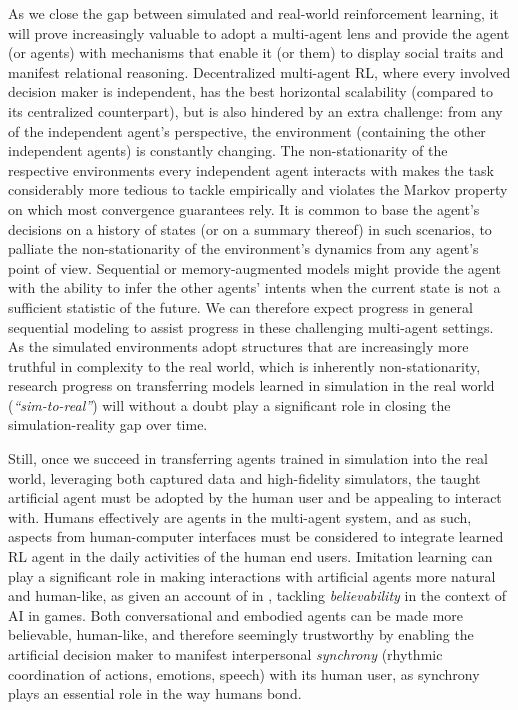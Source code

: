 As we close the gap between simulated and real-world reinforcement learning, it will prove increasingly valuable to
adopt a multi-agent lens and provide the agent (or agents) with mechanisms
that enable it (or them) to display social traits and manifest relational reasoning.
Decentralized multi-agent RL, where every involved decision maker is independent,
has the best horizontal scalability (compared to its centralized counterpart), but is also
hindered by an extra challenge:
from any of the independent agent's perspective, the environment (containing the other independent agents) is
constantly changing.
The non-stationarity of the respective environments every independent agent interacts with
makes the task considerably more tedious to tackle empirically and violates the Markov property
on which most convergence guarantees rely.
It is common to base the agent's decisions on a history of states (or on a summary thereof) in such scenarios,
to palliate the non-stationarity of the environment's dynamics from any agent's point of view.
Sequential or memory-augmented models might provide the agent with the ability to infer the other agents' intents
when the current state is not a sufficient statistic of the future.
We can therefore expect progress in general sequential modeling to assist progress in
these challenging multi-agent settings.
As the simulated environments adopt structures that are increasingly more truthful in complexity
to the real world, which is inherently non-stationarity,
research progress on transferring models learned in simulation in the real world (\textit{``sim-to-real''}) will
without a doubt play a significant role in closing the simulation-reality gap over time.

Still, once we succeed in transferring agents trained in simulation into the real world,
leveraging both captured data and high-fidelity simulators,
the taught artificial agent must be adopted by the human user and be appealing to interact with.
Humans effectively are agents in the multi-agent system, and as such,
aspects from human-computer interfaces must be considered to integrate learned RL agent in
the daily activities of the human end users.
Imitation learning can play a significant role in making interactions with artificial agents
more natural and human-like, as given an account of in
\cite{Livingstone2006-ln,Tence2010-qt},
tackling \emph{believability} in the context of AI in games.
Both conversational and embodied agents can be made more believable, human-like,
and therefore seemingly trustworthy by enabling the artificial decision maker to manifest
interpersonal \emph{synchrony}
(rhythmic coordination of actions, emotions, speech)
with its human user,
as synchrony plays an essential role in the way humans bond.



